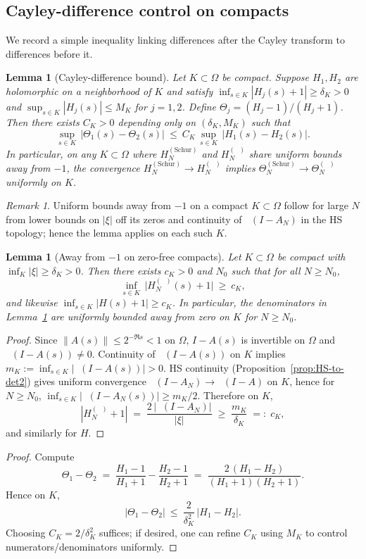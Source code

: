 \documentclass[11pt]{article}
\newtheorem{lemma}[theorem]{Lemma}
\theoremstyle{definition}
\theoremstyle{remark}
\newtheorem{remark}[theorem]{Remark}
\DeclareMathOperator{\dettwo}{det_2}
\begin{document}
\subsection{Cayley-difference control on compacts}\label{subsec:Cayley-difference}
We record a simple inequality linking differences after the Cayley transform to differences before it.

\begin{lemma}[Cayley-difference bound]\label{lem:Cayley-diff}
Let \(K\subset\Omega\) be compact. Suppose \(H_1,H_2\) are holomorphic on a neighborhood of \(K\) and satisfy \(\inf_{s\in K}|H_j(s)+1|\ge \delta_K>0\) and \(\sup_{s\in K}|H_j(s)|\le M_K\) for \(j=1,2\). Define \(\Theta_j=(H_j-1)/(H_j+1)\). Then there exists \(C_K>0\) depending only on \((\delta_K,M_K)\) such that
\[
 \sup_{s\in K}\,\big|\Theta_1(s)-\Theta_2(s)\big|\ \le\ C_K\,\sup_{s\in K}\,\big|H_1(s)-H_2(s)\big|.
\]
In particular, on any \(K\subset\Omega\) where \(H_N^{(\mathrm{Schur})}\) and \(H_N^{(\dettwo)}\) share uniform bounds away from \(-1\), the convergence \(H_N^{(\mathrm{Schur})}\to H_N^{(\dettwo)}\) implies \(\Theta_N^{(\mathrm{Schur})}\to \Theta_N^{(\dettwo)}\) uniformly on \(K\).
\end{lemma}
\begin{remark}
Uniform bounds away from \(-1\) on a compact \(K\subset\Omega\) follow for large \(N\) from lower bounds on \(|\xi|\) off its zeros and continuity of \(\dettwo(I-A_N)\) in the HS topology; hence the lemma applies on each such \(K\).
\end{remark}

\begin{lemma}[Away from \(-1\) on zero-free compacts]\label{lem:away-minus-one}
Let \(K\subset\Omega\) be compact with \(\inf_{K}|\xi|\ge \delta_K>0\). Then there exists \(c_K>0\) and \(N_0\) such that for all \(N\ge N_0\),
\[
 \inf_{s\in K}\,\bigl| H_N^{(\dettwo)}(s)+1\bigr|\ \ge\ c_K,
\]
and likewise \(\inf_{s\in K}|H(s)+1|\ge c_K\). In particular, the denominators in Lemma~\ref{lem:Cayley-diff} are uniformly bounded away from zero on \(K\) for \(N\ge N_0\).
\end{lemma}
\begin{proof}
Since \(\|A(s)\|\le 2^{-\Re s}<1\) on \(\Omega\), \(I-A(s)\) is invertible on \(\Omega\) and \(\dettwo(I-A(s))\ne 0\). Continuity of \(\dettwo(I-A(s))\) on \(K\) implies \(m_K:=\inf_{s\in K}|\dettwo(I-A(s))|>0\). HS continuity (Proposition~\ref{prop:HS-to-det2}) gives uniform convergence \(\dettwo(I-A_N)\to \dettwo(I-A)\) on \(K\), hence for \(N\ge N_0\), \(\inf_{s\in K}|\dettwo(I-A_N(s))|\ge m_K/2\). Therefore on \(K\),
\[
 |H_N^{(\dettwo)}+1|\;=\;\frac{2\,|\dettwo(I-A_N)|}{|\xi|}\;\ge\;\frac{m_K}{\delta_K}\;=:\;c_K,
\]
and similarly for \(H\).
\end{proof}
\begin{proof}
Compute
\[
 \Theta_1-\Theta_2\;=\;\frac{H_1-1}{H_1+1}-\frac{H_2-1}{H_2+1}
 \;=\;\frac{2\,(H_1-H_2)}{(H_1+1)(H_2+1)}.
\]
Hence on \(K\),
\[
 |\Theta_1-\Theta_2|\ \le\ \frac{2}{\delta_K^2}\,|H_1-H_2|.
\]
Choosing \(C_K=2/\delta_K^2\) suffices; if desired, one can refine \(C_K\) using \(M_K\) to control numerators/denominators uniformly.
\end{proof}
\end{document}
